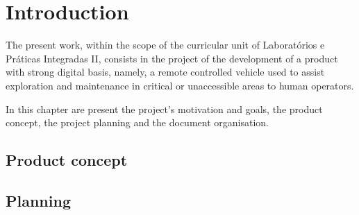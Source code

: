 

%

\chapter{Introduction}
The present work, within the scope of the curricular unit of Laboratórios e
Práticas Integradas II, consists in the project of the development of a product
with strong digital basis, namely, a remote controlled vehicle used to assist
exploration and maintenance in critical or unaccessible areas to human operators.

In this chapter are present the project's motivation and goals, the product
concept, the project planning and the document organisation.
%
%
%

\section{Product concept}%
\label{sec:product-concept}

%
%
%
%
\section{Planning}%
\label{sec:planning}


%
